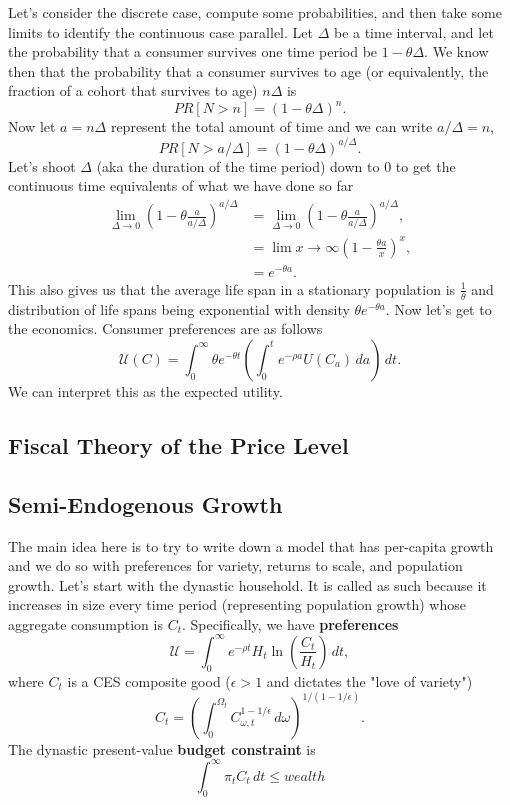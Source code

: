 \documentclass[11pt,english]{article}
\begin{document}
Let's consider the discrete case, compute some probabilities, and then take some limits to identify the continuous case parallel. Let $\Delta$ be a time interval, and let the probability that a consumer survives one time period be $1 - \theta \Delta$. We know then that the probability that a consumer survives to age (or equivalently, the fraction of a cohort that survives to age) $n\Delta$ is $$PR[N > n] = (1 - \theta \Delta)^n.$$ Now let $a = n\Delta$ represent the total amount of time and we can write $a / \Delta = n$, $$PR[N > a/\Delta] = \left(1 - \theta\Delta\right)^{a/\Delta}.$$ Let's shoot $\Delta$ (aka the duration of the time period) down to $0$ to get the continuous time equivalents of what we have done so far
\begin{align*}
\lim_{\Delta \to 0}\left(1 - \theta\frac{a}{a/\Delta}\right)^{a/\Delta} &= \lim_{\Delta \to 0}\left(1 - \theta\frac{a}{a/\Delta}\right)^{a/\Delta},\\
&= \lim{x\to \infty} \left(1 - \frac{\theta a}{x}\right)^x,\\
&= e^{-\theta a}.
\end{align*} This also gives us that the average life span in a stationary population is $\frac{1}{\theta}$ and distribution of life spans being exponential with density $\theta e^{-\theta a}$. Now let's get to the economics. Consumer preferences are as follows
$$\mathcal{U}(C) = \int_0^\infty \theta e^{-\theta t}\left(\int_0^t e^{-\rho a} U(C_a)\,da\right)\,dt.$$We can interpret this as the expected utility.

\subsection{Fiscal Theory of the Price Level}


\subsection{Semi-Endogenous Growth}
The main idea here is to try to write down a model that has per-capita growth and we do so with preferences for variety, returns to scale, and population growth. Let's start with the dynastic household. It is called as such because it increases in size every time period (representing population growth) whose aggregate consumption is $C_t$. Specifically, we have \textbf{preferences} $$\mathcal{U} = \int_0^\infty e^{-\rho t}H_t\ln\left(\frac{C_t}{H_t}\right)\,dt,$$ where $C_t$ is a CES composite good ($\epsilon > 1$ and dictates the "love of variety") $$C_t =\left( \int_0^{\Omega_t}C_{\omega, t}^{1 - 1/\epsilon}\,d\omega\right)^{1 / (1 - 1/\epsilon)}.$$The dynastic present-value \textbf{budget constraint} is $$\int_0^\infty\pi_t C_t\,dt \leq wealth$$
\end{document}
